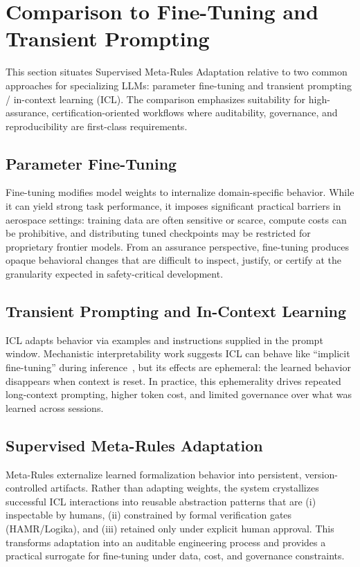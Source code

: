 \documentclass[conference]{IEEEtran}
\begin{document}
\section{Comparison to Fine-Tuning and Transient Prompting}
\label{sec:comparison}

This section situates Supervised Meta-Rules Adaptation relative to two common approaches for specializing LLMs: parameter fine-tuning and transient prompting / in-context learning (ICL). The comparison emphasizes suitability for high-assurance, certification-oriented workflows where auditability, governance, and reproducibility are first-class requirements.

\subsection{Parameter Fine-Tuning}
Fine-tuning modifies model weights to internalize domain-specific behavior. While it can yield strong task performance, it imposes significant practical barriers in aerospace settings: training data are often sensitive or scarce, compute costs can be prohibitive, and distributing tuned checkpoints may be restricted for proprietary frontier models. From an assurance perspective, fine-tuning produces opaque behavioral changes that are difficult to inspect, justify, or certify at the granularity expected in safety-critical development.

\subsection{Transient Prompting and In-Context Learning}
ICL adapts behavior via examples and instructions supplied in the prompt window. Mechanistic interpretability work suggests ICL can behave like ``implicit fine-tuning'' during inference~\cite{vonoswald2023transformers}, but its effects are ephemeral: the learned behavior disappears when context is reset. In practice, this ephemerality drives repeated long-context prompting, higher token cost, and limited governance over what was learned across sessions.

\subsection{Supervised Meta-Rules Adaptation}
Meta-Rules externalize learned formalization behavior into persistent, version-controlled artifacts. Rather than adapting weights, the system crystallizes successful ICL interactions into reusable abstraction patterns that are (i) inspectable by humans, (ii) constrained by formal verification gates (HAMR/Logika), and (iii) retained only under explicit human approval. This transforms adaptation into an auditable engineering process and provides a practical surrogate for fine-tuning under data, cost, and governance constraints.
\end{document}
